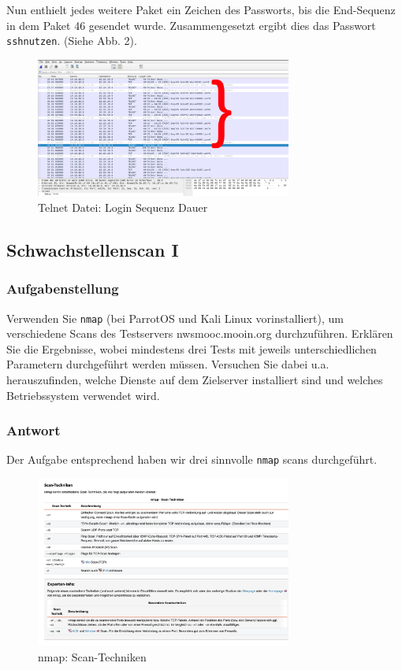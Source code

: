 \documentclass{article}
\begin{document}
Nun enthielt jedes weitere Paket ein Zeichen des Passworts, bis die End-Sequenz
in dem Paket 46 gesendet wurde. Zusammengesetzt ergibt dies das 
Passwort \texttt{sshnutzen}. (Siehe Abb. 2).

\begin{figure}[H]
	\includegraphics[width=0.75\textwidth]{images/02}
	\centering
	\caption{Telnet Datei: Login Sequenz Dauer}
\end{figure}

\newpage

\subsection{Schwachstellenscan I}

\subsubsection*{Aufgabenstellung}

Verwenden Sie \texttt{nmap} (bei ParrotOS und Kali Linux vorinstalliert), um verschiedene 
Scans des Testservers nwsmooc.mooin.org durchzuführen. Erklären Sie die Ergebnisse, wobei 
mindestens drei Tests mit jeweils unterschiedlichen Parametern durchgeführt werden müssen. 
Versuchen Sie dabei u.a. herauszufinden, welche Dienste auf dem Zielserver installiert
sind und welches Betriebssystem verwendet wird.

\subsubsection*{Antwort}

Der Aufgabe entsprechend haben wir drei sinnvolle \texttt{nmap} scans durchgeführt. 

\begin{figure}[H]
	\includegraphics[width=0.75\textwidth]{images/03}
	\centering
	\caption{nmap: Scan-Techniken}
\end{figure}
\end{document}
